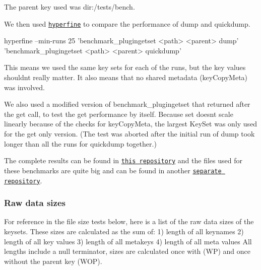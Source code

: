 The parent key used was {\ttfamily dir\+:/tests/bench}.

We then used \href{https://github.com/sharkdp/hyperfine}{\tt {\ttfamily hyperfine}} to compare the performance of {\ttfamily dump} and {\ttfamily quickdump}.


\begin{DoxyCode}
hyperfine --min-runs 25 'benchmark\_plugingetset <path> <parent> dump' 'benchmark\_plugingetset <path>
       <parent> quickdump'
\end{DoxyCode}


This means we used the same key sets for each of the runs, but the key values shouldn\textquotesingle{}t really matter. It also means that no shared metadata ({\ttfamily key\+Copy\+Meta}) was involved.

We also used a modified version of {\ttfamily benchmark\+\_\+plugingetset} that returned after the {\ttfamily get} call, to test the {\ttfamily get} performance by itself. Because {\ttfamily set} doesn\textquotesingle{}t scale linearly because of the checks for {\ttfamily key\+Copy\+Meta}, the largest Key\+Set was only used for the {\ttfamily get} only version. (The test was aborted after the initial run of {\ttfamily dump} took longer than all the runs for {\ttfamily quickdump} together.)

The complete results can be found in \href{https://github.com/ElektraInitiative/rawdata}{\tt this repository} and the files used for these benchmarks are quite big and can be found in another \href{https://github.com/kodebach/eqd-bench}{\tt separate repository}.\hypertarget{autotoc_md517_autotoc_md520}{}\subsubsection{Raw data sizes}\label{autotoc_md517_autotoc_md520}
For reference in the file size tests below, here is a list of the raw data sizes of the keysets. These sizes are calculated as the sum of\+: 1) length of all keynames 2) length of all key values 3) length of all metakeys 4) length of all meta values All lengths include a null terminator, sizes are calculated once with (WP) and once without the parent key (W\+OP).

